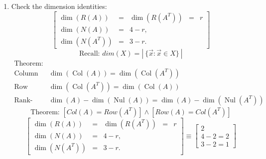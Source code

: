 \documentclass[9pt]{article}
\theoremstyle{plain}
\begin{document}
\begin{enumerate}
	\item[(f)] Check the dimension identities:
	      \[
		      \left[
			      \begin{array}{ccccc}
				      \dim(R(A))     & = & \dim(R(A^{T})) & = & r \\
				      \dim(N(A))     & = & 4-r,                   \\
				      \dim(N(A^{T})) & = & 3-r.
			      \end{array}
			      \right]
	      \]
	      \[\text{Recall: } dim(X) = |~\{ \vec{x} : \vec{x} \in X \}~| \]
	      \[
		      \begin{array}{rl}
			      \text{Theorem:}      &                                                                                 \\
			      \text{Column space:} & \dim(\operatorname{Col}(A)) = \dim(\operatorname{Col}(A^T))                     \\
			      \text{Row space:}    & \dim(\operatorname{Col}(A^T)) = \dim(\operatorname{Col}(A))                     \\
			      \text{Rank-nullity:} & \dim(A) - \dim(\operatorname{Nul}(A)) = \dim(A) - \dim(\operatorname{Nul}(A^T))
		      \end{array}
	      \]
	      \[
		      \text{Theorem: } [Col(A) = Row(A^T)] \land [Row(A) = Col(A^T)]
	      \]
	      \[
		      \left[
			      \begin{array}{ccccc}
				      \dim(R(A))     & = & \dim(R(A^{T})) & = & r \\
				      \dim(N(A))     & = & 4-r,                   \\
				      \dim(N(A^{T})) & = & 3-r.
			      \end{array}
			      \right] \equiv
		      \begin{bmatrix}
			      2       \\
			      4-2 = 2 \\
			      3-2 = 1
		      \end{bmatrix}
	      \]


\end{enumerate}
\end{document}
